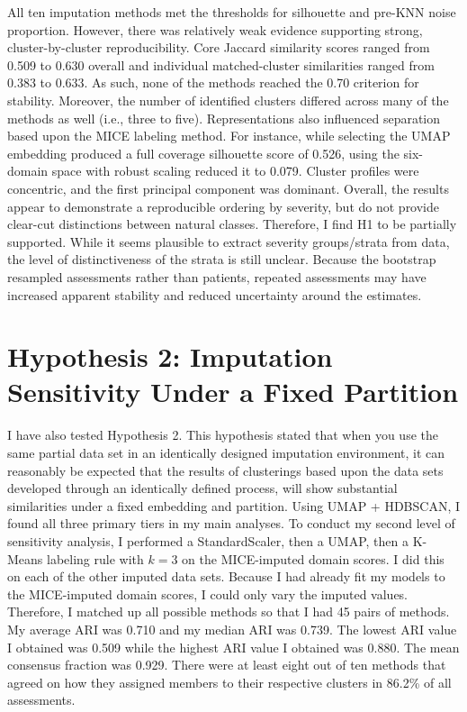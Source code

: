 All ten imputation methods met the thresholds for silhouette and pre-KNN noise proportion. However, there was relatively weak evidence supporting strong, cluster-by-cluster reproducibility. Core Jaccard similarity scores ranged from 0.509 to 0.630 overall and individual matched-cluster similarities ranged from 0.383 to 0.633. As such, none of the methods reached the 0.70 criterion for stability. Moreover, the number of identified clusters differed across many of the methods as well (i.e., three to five). Representations also influenced separation based upon the MICE labeling method. For instance, while selecting the UMAP embedding produced a full coverage silhouette score of 0.526, using the six-domain space with robust scaling reduced it to 0.079. Cluster profiles were concentric, and the first principal component was dominant. Overall, the results appear to demonstrate a reproducible ordering by severity, but do not provide clear-cut distinctions between natural classes. Therefore, I find H1 to be partially supported. While it seems plausible to extract severity groups/strata from data, the level of distinctiveness of the strata is still unclear. Because the bootstrap resampled assessments rather than patients, repeated assessments may have increased apparent stability and reduced uncertainty around the estimates.

\section{Hypothesis 2: Imputation Sensitivity Under a Fixed Partition}\label{sec:h2_results}
I have also tested Hypothesis 2. This hypothesis stated that when you use the same partial data set in an identically designed imputation environment, it can reasonably be expected that the results of clusterings based upon the data sets developed through an identically defined process, will show substantial similarities under a fixed embedding and partition. Using UMAP + HDBSCAN, I found all three primary tiers in my main analyses. To conduct my second level of sensitivity analysis, I performed a StandardScaler, then a UMAP, then a K-Means labeling rule with \(k=3\) on the MICE-imputed domain scores. I did this on each of the other imputed data sets. Because I had already fit my models to the MICE-imputed domain scores, I could only vary the imputed values. Therefore, I matched up all possible methods so that I had 45 pairs of methods. My average ARI was 0.710 and my median ARI was 0.739. The lowest ARI value I obtained was 0.509 while the highest ARI value I obtained was 0.880. The mean consensus fraction was 0.929. There were at least eight out of ten methods that agreed on how they assigned members to their respective clusters in 86.2\% of all assessments.

